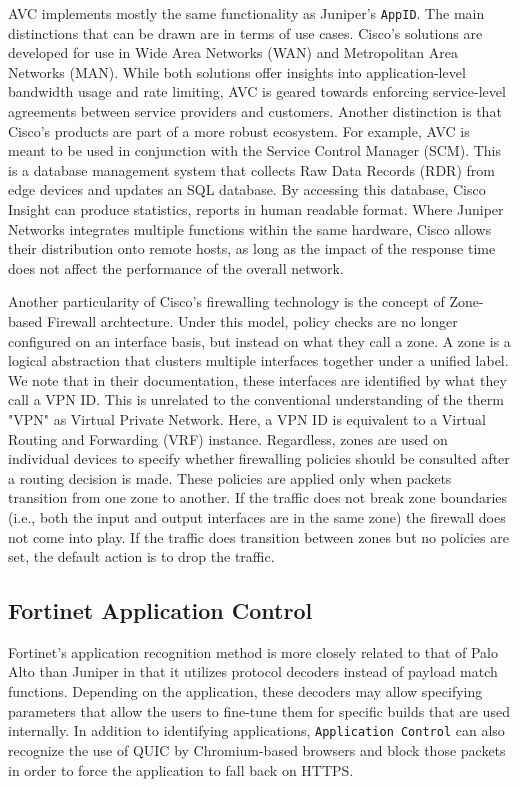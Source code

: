 AVC implements mostly the same functionality as Juniper's \texttt{AppID}. The main
distinctions that can be drawn are in terms of use cases. Cisco's solutions are
developed for use in Wide Area Networks (WAN) and Metropolitan Area Networks (MAN).
While both solutions offer insights into application-level bandwidth usage and
rate limiting, AVC is geared towards enforcing service-level agreements between
service providers and customers. Another distinction is that Cisco's products
are part of a more robust ecosystem. For example, AVC is meant to be used in
conjunction with the Service Control Manager (SCM). This is a database management
system that collects Raw Data Records (RDR) from edge devices and updates an SQL
database. By accessing this database, Cisco Insight can produce statistics,
reports in human readable format. Where Juniper Networks integrates multiple
functions within the same hardware, Cisco allows their distribution onto remote
hosts, as long as the impact of the response time does not affect the performance
of the overall network.

Another particularity of Cisco's firewalling technology is the concept of Zone-based
Firewall archtecture. Under this model, policy checks are no longer configured
on an interface basis, but instead on what they call a zone. A zone is a logical
abstraction that clusters multiple interfaces together under a unified label.
We note that in their documentation, these interfaces are identified by what they
call a VPN ID. This is unrelated to the conventional understanding of the
therm "VPN" as Virtual Private Network. Here, a VPN ID is equivalent to a
Virtual Routing and Forwarding (VRF) instance. Regardless, zones are used on
individual devices to specify whether firewalling policies should be consulted
after a routing decision is made. These policies are applied only when packets
transition from one zone to another. If the traffic does not break zone
boundaries (i.e., both the input and output interfaces are in the same zone)
the firewall does not come into play. If the traffic does transition between
zones but no policies are set, the default action is to drop the traffic.

\subsection{Fortinet Application Control}

Fortinet's application recognition method is more closely related to that of
Palo Alto than Juniper in that it utilizes protocol decoders instead of payload
match functions. Depending on the application, these decoders may allow
specifying parameters that allow the users to fine-tune them for specific
builds that are used internally. In addition to identifying applications,
\texttt{Application Control} can also recognize the use of QUIC by Chromium-based
browsers and block those packets in order to force the application to fall back
on HTTPS.

